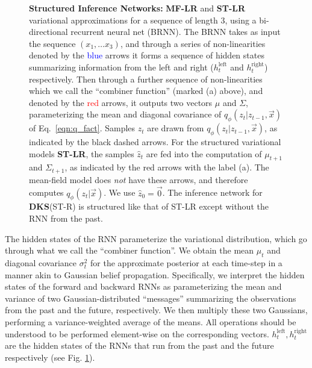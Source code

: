 \documentclass[letterpaper]{article}
\newcommand{\vecx}{\vec{x}}
\theoremstyle{plain}
\newcommand{\DKS}{\textbf{DKS}\xspace}
\begin{document}
\begin{figure}[t]
	\caption{\label{fig:var_approx_all}\small \textbf{Structured Inference Networks: } \textbf{MF-LR} and
          \textbf{ST-LR} variational approximations for a sequence of
          length $3$, using a bi-directional recurrent neural net
          (BRNN). The BRNN takes as input the sequence $(x_1, \ldots
          x_3)$, and through a series of non-linearities denoted by
          the \textcolor{blue}{blue} arrows it forms a sequence of
          hidden states summarizing information from the left and right 
          ($h_t^{\text{left}}$ and $h_t^{\text{right}}$)
          respectively. Then through a further sequence of
          non-linearities which we call the ``combiner function'' (marked (a) above), and
          denoted by the \textcolor{red}{red} arrows, it outputs two
          vectors $\mu$ and $\Sigma$, parameterizing the mean and
          diagonal covariance of $q_\phi(z_t|z_{t-1}, \vecx)$ of Eq.~\ref{eqn:q_fact}. Samples $\hat{z}_t$ are drawn from $q_\phi(z_t|z_{t-1},\vecx)$, as indicated by the black dashed arrows.
	For the structured variational models \textbf{ST-LR}, the samples $\hat{z}_t$ are fed into the computation of $\mu_{t+1}$ and $\Sigma_{t+1}$, as indicated by the red arrows with the label (a). The mean-field model does \emph{not} have these arrows, and therefore computes $q_\phi(z_t|\vecx)$. 
	We use $\hat{z}_0 = \vec{0}$.
	The inference network for \DKS (ST-R) is structured like that of ST-LR except without the RNN from the past. 
} 
\end{figure}


The hidden states of the RNN parameterize the variational
distribution, which go through what we call the ``combiner function''.
We obtain the mean $\mu_t$ and diagonal covariance $\sigma^2_t$ for the
approximate posterior at each time-step in a manner akin to Gaussian belief
propagation. Specifically, we interpret the hidden states of the
forward and backward RNNs as parameterizing the mean and variance of
two Gaussian-distributed ``messages'' summarizing the observations from the
past and the future, respectively. We then multiply these two
Gaussians, performing a variance-weighted average of the means. 
All operations should be understood to be performed
element-wise on the corresponding vectors.
$h_t^{\text{left}},h_t^{\text{right}}$ are the hidden states of the RNNs that run from the past and the future
respectively (see Fig. \ref{fig:var_approx_all}). 
\end{document}
